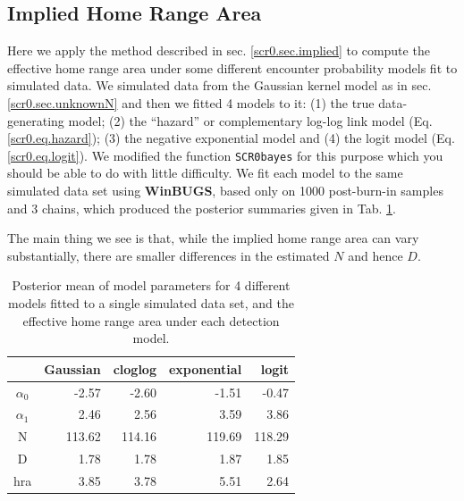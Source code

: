 \subsection{Implied Home Range Area}

Here we apply the method described in sec. \ref{scr0.sec.implied} to
compute the effective home range area under some different encounter
probability models fit to simulated data. 
We simulated data from the Gaussian kernel model as in 
sec. \ref{scr0.sec.unknownN} and then we fitted 4 models to it: (1)
the true data-generating model; (2) the ``hazard'' or complementary log-log link 
model (Eq. \ref{scr0.eq.hazard}); (3) the negative exponential model
and (4) the logit model (Eq. \ref{scr0.eq.logit}).
We modified the function \mbox{\tt  SCR0bayes} for this purpose which
you should be able to do with little difficulty. We fit each model to
the same simulated  data set using {\bf WinBUGS}, based only on 1000
post-burn-in samples and 3 chains, which produced the posterior
summaries given in Tab. \ref{scr0.tab.implied}.

The main thing we see is that, while the implied home range area can
vary substantially, there 
are smaller differences in the estimated $N$ and hence $D$. 


\begin{table}
\centering
\caption{
Posterior mean of model parameters for 4 different models fitted to a
single simulated data set,
  and the effective home range area under each detection model.
}
\begin{tabular}{crrrr}
\hline \hline 
     &  Gaussian & cloglog &exponential & logit \\  \hline
$\alpha_0$  &  -2.57 &  -2.60 & -1.51 & -0.47 \\
$\alpha_1$  &  2.46  & 2.56  & 3.59  & 3.86 \\
N           & 113.62& 114.16 &119.69& 118.29 \\
D           & 1.78  & 1.78  & 1.87  & 1.85 \\
hra         & 3.85  & 3.78 &  5.51  & 2.64 \\
\end{tabular}
\label{scr0.tab.implied}
\end{table}



